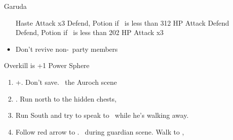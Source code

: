 \begin{battle}[1800]{Garuda}
	\begin{itemize}
		\tidusf Haste \auron
		\auronf Attack x3
		\wakkaf Defend, Potion if \tidus\ is less than 312 HP
		\tidusf Attack
		\tidusf Defend
		\wakkaf Defend, Potion if \auron\ is less than 202 HP
		\auronf Attack x3
		\item Don't revive non-\auron\ party members
	\end{itemize}
	Overkill is +1 Power Sphere
\end{battle}
\begin{enumerate}[resume]
	\item \cs+\skippablefmv[1:30]. Don't save. \sd\ the Auroch scene
	\item \cs[4:50]. Run north to the hidden chests, 
	\item Run South and try to speak to \auron\ while he's walking away.
	\item Follow red arrow to \yuna. \sd\ during guardian scene. Walk to \yuna, \cs[4:20]
\end{enumerate}